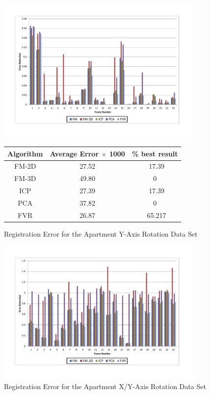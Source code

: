\begin{figure}
\centering
\includegraphics[width=4in]{images/results/Apartment_Texture_Rotate}
\caption{Registration Error for the Apartment Y-Axis Rotation Data Set}
\label{fig:PET0}

\begin{tabular}{ccc}
\hline
\textbf{Algorithm} & \textbf{Average Error $\times$ 1000} & \textbf{\% best result}\\ \hline
FM-2D	& 27.52 & ~17.39\\
FM-3D	& 49.80 & 0\\
ICP		& 27.39 & ~17.39\\
PCA		& 37.82 & 0\\
FVR		& 26.87 & ~65.217\\
\end{tabular}
\label{tab:PET0ST}
\end{figure} 


\begin{figure}[!htb]
\centering
\includegraphics[width=4.0in]{images/results/Apartment_Texture_Rotate_XAxis}
\caption{Registration Error for the Apartment X/Y-Axis Rotation Data Set}
\label{fig:PET1}
\end{figure}

